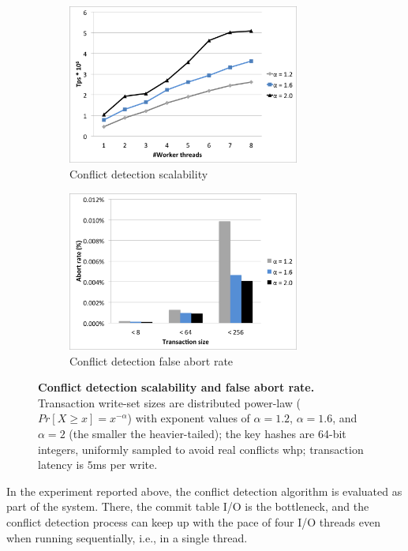 \begin{figure}[tb]
\begin{subfigure}{\columnwidth}
\centerline{     \includegraphics[width=\columnwidth, height=5.25cm]{CDPerf.png} }
	\hspace{0.25cm}
    \caption{Conflict detection scalability}
    \label{fig:1}
  \end{subfigure}
\hspace{\columnsep}
\begin{subfigure}{\columnwidth}
\centerline{      \includegraphics[width=\columnwidth, height=5.25cm]{CDAbort.png} }
	\hspace{0.25cm}
    \caption{Conflict detection false abort rate}
    \label{fig:2}
  \end{subfigure}
\caption{{\bf Conflict detection scalability and false abort rate.} Transaction write-set sizes are distributed power-law ($Pr[X \geq x] = x^{-\alpha}$) 
with exponent values of $\alpha=1.2$, $\alpha=1.6$, and $\alpha=2$ (the smaller the 
heavier-tailed); the key hashes are $6$4-bit integers, uniformly sampled to avoid real conflicts whp; transaction latency is $5$ms per write.}
\label{fig:cd_perf}
\end{figure}

In the experiment reported  above, the conflict detection algorithm is evaluated as part of the system.
There, the commit table I/O is the bottleneck, and the conflict detection process can keep up with the pace
of four I/O threads even when running sequentially, i.e., in a single thread. 

